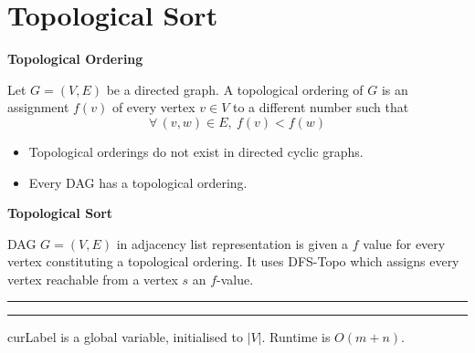 \documentclass{article}
\begin{document}
	\section{Topological Sort}
	
	\begin{center}
		\begin{large}
			\textbf{Topological Ordering}
		\end{large}
	\end{center}
	\vspace{0.1mm}
	Let $G = (V,E)$ be a directed graph. A topological ordering of $G$ is an assignment $f(v)$ of every vertex $v \in V$ to a different number such that \[\forall \, (v,w) \in E, \: f(v) < f(w)\]
	
	\begin{itemize}
		\item Topological orderings do not exist in directed cyclic graphs.
		\item Every DAG has a topological ordering.
	\end{itemize}   
	
	\vspace{0.3mm}
	
	\begin{center}
		\begin{large}
			\textbf{Topological Sort}
		\end{large}
	\end{center}
	\vspace{0.1mm}
	DAG $G = (V,E)$ in adjacency list representation is given a $f$ value for every vertex constituting a topological ordering. It uses DFS-Topo which assigns every vertex reachable from a vertex $s$ an $f$-value.
	
	\begin{algorithm}[H]
		\SetAlgoLined
		\caption{TopoSort}
		\BlankLine
		\hrule
		\BlankLine
	\end{algorithm}
	
	\begin{algorithm}[H]
		\SetAlgoLined
		\caption{DFS-Topo}
		\BlankLine
		\hrule
		\BlankLine
	\end{algorithm} 
	curLabel is a global variable, initialised to $|V|$. Runtime is $O(m+n)$.
	
\end{document}
